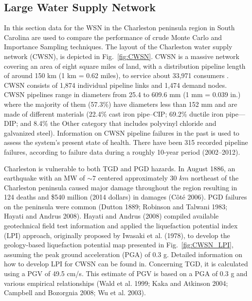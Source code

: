     \subsection{Large Water Supply Network}
        In this section data for the WSN in the Charleston peninsula region in South Carolina are used to compare the performance of crude Monte Carlo and Importance Sampling techniques. The layout of the Charleston water supply network (CWSN), is depicted in Fig.~\ref{fig:CWSN}. CWSN is a massive network covering an area of eight square miles of land, with a distribution pipeline length of around 150 km (1 km = 0.62 miles), to service about 33,971 consumers \cite{noauthor_city_2021}. \\
        CWSN consists of 1,874 individual pipeline links and 1,474 demand nodes. CWSN pipelines range in diameters from 25.4 to 609.6 mm (1 mm = 0.039 in.) where the majority of them (57.3\%) have diameters less than 152 mm and are made of different materials (22.4\% cast iron pipe–CIP; 69.2\% ductile iron pipe—DIP; and 8.4\% the Other category that includes polyvinyl chloride and galvanized steel).
        Information on CWSN pipeline failures in the past is used to assess the system's present state of health. There have been 315 recorded pipeline failures, according to failure data during a roughly 10-year period (2002–2012).

            

        Charleston is vulnerable to both TGD and PGD hazards. In August 1886, an earthquake with an MW of $\sim7$ centered approximately 30 $km$ northeast of the Charleston peninsula caused major damage throughout the region resulting in 124 deaths and \$540 million
        (2014 dollars) in damages (Côté 2006). PGD failures on the peninsula were common (Dutton 1889; Robinson and Talwani 1983; Hayati and Andrus 2008).
        Hayati and Andrus (2008) compiled available geotechnical field test information and applied the liquefaction potential index (LPI) approach, originally proposed by Iwasaki et al. (1978), to
        develop the geology-based liquefaction potential map presented
        in Fig.~\ref{fig:CWSN_LPI}, assuming the peak ground acceleration (PGA) of 0.3 g.
        Detailed information on how to develop LPI for CWSN can be found in.
        Concerning TGD, it is calculated using a PGV of 49.5 cm/s.
        This estimate of PGV is based on a PGA of 0.3 g and various empirical relationships (Wald et al. 1999; Kaka and Atkinson 2004;
        Campbell and Bozorgnia 2008; Wu et al. 2003).

            
    


